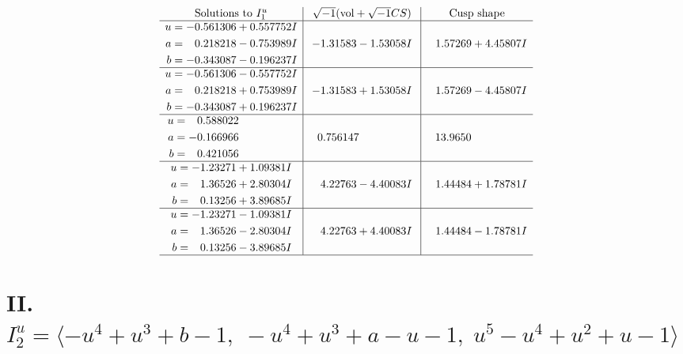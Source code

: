 \documentclass[1p]{elsarticle_modified}
\theoremstyle{definition}
\newcommand{\I}{\sqrt{-1}}
\begin{document}
$$\begin{array}{c|c|c}  
\text{Solutions to }I^u_{1}& \I (\text{vol} + \sqrt{-1}CS) & \text{Cusp shape}\\
 \hline 
\begin{aligned}
u &= -0.561306 + 0.557752 I \\
a &= \phantom{-}0.218218 - 0.753989 I \\
b &= -0.343087 - 0.196237 I\end{aligned}
 & -1.31583 - 1.53058 I & \phantom{-}1.57269 + 4.45807 I \\ \hline\begin{aligned}
u &= -0.561306 - 0.557752 I \\
a &= \phantom{-}0.218218 + 0.753989 I \\
b &= -0.343087 + 0.196237 I\end{aligned}
 & -1.31583 + 1.53058 I & \phantom{-}1.57269 - 4.45807 I \\ \hline\begin{aligned}
u &= \phantom{-}0.588022\phantom{ +0.000000I} \\
a &= -0.166966\phantom{ +0.000000I} \\
b &= \phantom{-}0.421056\phantom{ +0.000000I}\end{aligned}
 & \phantom{-}0.756147\phantom{ +0.000000I} & \phantom{-}13.9650\phantom{ +0.000000I} \\ \hline\begin{aligned}
u &= -1.23271 + 1.09381 I \\
a &= \phantom{-}1.36526 + 2.80304 I \\
b &= \phantom{-}0.13256 + 3.89685 I\end{aligned}
 & \phantom{-}4.22763 - 4.40083 I & \phantom{-}1.44484 + 1.78781 I \\ \hline\begin{aligned}
u &= -1.23271 - 1.09381 I \\
a &= \phantom{-}1.36526 - 2.80304 I \\
b &= \phantom{-}0.13256 - 3.89685 I\end{aligned}
 & \phantom{-}4.22763 + 4.40083 I & \phantom{-}1.44484 - 1.78781 I\\
 \hline 
 \end{array}$$\newpage\newpage\renewcommand{\arraystretch}{1}
\centering \section*{II. $I^u_{2}= \langle - u^4+u^3+b-1,\;- u^4+u^3+a- u-1,\;u^5- u^4+u^2+u-1 \rangle$}
\end{document}
